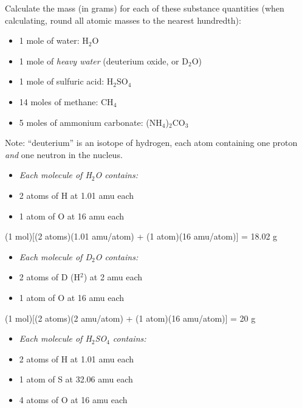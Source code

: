 

Calculate the mass (in grams) for each of these substance quantities (when calculating, round all atomic masses to the nearest hundredth):

\begin{itemize} 
\item{} 1 mole of water: H$_{2}$O
\item{} 1 mole of {\it heavy water} (deuterium oxide, or D$_{2}$O)
\item{} 1 mole of sulfuric acid: H$_{2}$SO$_{4}$
\item{} 14 moles of methane: CH$_{4}$
\item{} 5 moles of ammonium carbonate: (NH$_{4}$)$_{2}$CO$_{3}$
\end{itemize} 

\vskip 10pt

Note: ``deuterium'' is an isotope of hydrogen, each atom containing one proton {\it and} one neutron in the nucleus.







\begin{itemize} 
\item{} {\it Each molecule of H$_{2}$O contains:}
\item{} 2 atoms of H at 1.01 amu each
\item{} 1 atom of O at 16 amu each
\end{itemize} 

(1 mol)[(2 atoms)(1.01 amu/atom) + (1 atom)(16 amu/atom)] = 18.02 g

\vskip 10pt

\begin{itemize} 
\item{} {\it Each molecule of D$_{2}$O contains:}
\item{} 2 atoms of D (H$^{2}$) at 2 amu each
\item{} 1 atom of O at 16 amu each
\end{itemize} 

(1 mol)[(2 atoms)(2 amu/atom) + (1 atom)(16 amu/atom)] = 20 g

\vskip 10pt

\begin{itemize} 
\item{} {\it Each molecule of H$_{2}$SO$_{4}$ contains:}
\item{} 2 atoms of H at 1.01 amu each
\item{} 1 atom of S at 32.06 amu each
\item{} 4 atoms of O at 16 amu each
\end{itemize} 

